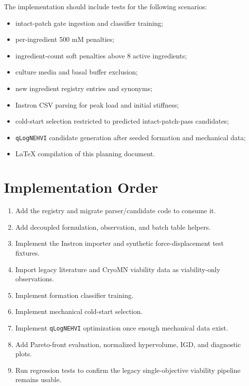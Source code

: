 \documentclass[11pt]{article}
\newcommand{\code}[1]{\texttt{#1}}
\begin{document}
The implementation should include tests for the following scenarios:
\begin{itemize}
    \item intact-patch gate ingestion and classifier training;
    \item per-ingredient 500 mM penalties;
    \item ingredient-count soft penalties above 8 active ingredients;
    \item culture media and basal buffer exclusion;
    \item new ingredient registry entries and synonyms;
    \item Instron CSV parsing for peak load and initial stiffness;
    \item cold-start selection restricted to predicted intact-patch-pass candidates;
    \item \code{qLogNEHVI} candidate generation after seeded formation and mechanical data;
    \item LaTeX compilation of this planning document.
\end{itemize}

\section{Implementation Order}

\begin{enumerate}
    \item Add the registry and migrate parser/candidate code to consume it.
    \item Add decoupled formulation, observation, and batch table helpers.
    \item Implement the Instron importer and synthetic force-displacement test fixtures.
    \item Import legacy literature and CryoMN viability data as viability-only observations.
    \item Implement formation classifier training.
    \item Implement mechanical cold-start selection.
    \item Implement \code{qLogNEHVI} optimization once enough mechanical data exist.
    \item Add Pareto-front evaluation, normalized hypervolume, IGD, and diagnostic plots.
    \item Run regression tests to confirm the legacy single-objective viability pipeline remains usable.
\end{enumerate}
\end{document}
